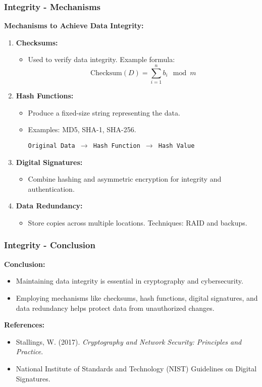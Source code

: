 \documentclass{beamer}
\begin{document}
\begin{frame}[fragile]
    \frametitle{Integrity - Mechanisms}
    \textbf{Mechanisms to Achieve Data Integrity:}
    \begin{enumerate}
        \item \textbf{Checksums:}
        \begin{itemize}
            \item Used to verify data integrity. Example formula:
            \[
            \text{Checksum}(D) = \sum_{i=1}^{n} b_i \mod m
            \]
        \end{itemize}
        
        \item \textbf{Hash Functions:}
        \begin{itemize}
            \item Produce a fixed-size string representing the data.
            \item Examples: MD5, SHA-1, SHA-256.
            \begin{center}
                \texttt{Original Data $\rightarrow$ Hash Function $\rightarrow$ Hash Value}
            \end{center}
        \end{itemize}
        
        \item \textbf{Digital Signatures:}
        \begin{itemize}
            \item Combine hashing and asymmetric encryption for integrity and authentication.
        \end{itemize}
        
        \item \textbf{Data Redundancy:}
        \begin{itemize}
            \item Store copies across multiple locations. Techniques: RAID and backups.
        \end{itemize}
    \end{enumerate}
\end{frame}

\begin{frame}[fragile]
    \frametitle{Integrity - Conclusion}
    \textbf{Conclusion:}
    \begin{itemize}
        \item Maintaining data integrity is essential in cryptography and cybersecurity.
        \item Employing mechanisms like checksums, hash functions, digital signatures, and data redundancy helps protect data from unauthorized changes.
    \end{itemize}

    \textbf{References:}
    \begin{itemize}
        \item Stallings, W. (2017). \textit{Cryptography and Network Security: Principles and Practice}.
        \item National Institute of Standards and Technology (NIST) Guidelines on Digital Signatures.
    \end{itemize}
\end{frame}
\end{document}
